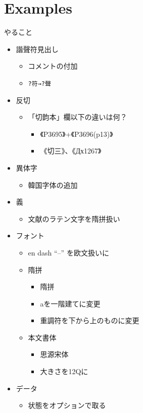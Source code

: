 \documentclass[a5paper]{article}
\begin{document}
\part{Examples}
やること
\begin{itemize}
\item{} 諧聲符見出し
  \begin{itemize}
  \item{} コメントの付加
  \item{} \verb|?符→?聲|
  \end{itemize}
\item{} 反切
  \begin{itemize}
  \item{} 「切韵本」欄以下の違いは何？
    \begin{itemize}
    \item 《P3695》+《P3696(p13)》
    \item 《切三》、《Дх1267》
    \end{itemize}
  \end{itemize}
\item{} 異体字
  \begin{itemize}
  \item{} 韓国字体の追加
  \end{itemize}
\item{} 義
  \begin{itemize}
  \item{} 文献のラテン文字を隋拼扱い
  \end{itemize}
\item{} フォント
  \begin{itemize}
  \item{} en dash “–” を欧文扱いに
  \item{} 隋拼
    \begin{itemize}
    \item{} 隋拼
    \item{} aを一階建てに変更
    \item{} 重調符を下から上のものに変更
    \end{itemize}
  \item{} 本文書体
    \begin{itemize}
    \item{} 思源宋体
    \item{} 大きさを12Qに
    \end{itemize}
  \end{itemize}
\item{} データ
  \begin{itemize}
  \item{} 状態をオプションで取る

\end{itemize}
\end{itemize}
\end{document}

